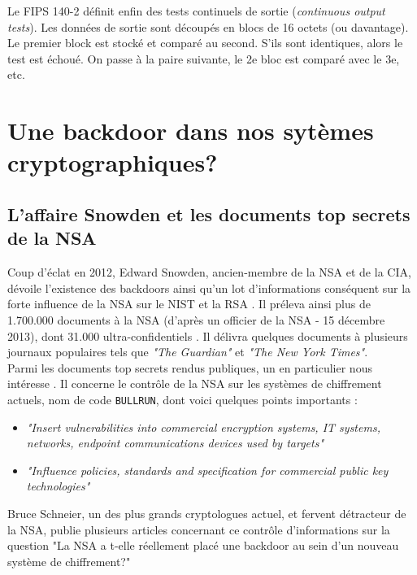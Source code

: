 		
		Le FIPS 140-2 définit enfin des tests continuels de sortie (\textit{continuous output tests}). Les données de sortie sont découpés en blocs de 16 octets (ou davantage). Le premier block est stocké et comparé au second. S'ils sont identiques, alors le test est échoué. On passe à la paire suivante, le 2e bloc est comparé avec le 3e, etc.

\section{Une backdoor dans nos sytèmes cryptographiques?}

	\subsection{L'affaire Snowden et les documents top secrets de la NSA}
	
	Coup d'éclat en 2012, Edward Snowden, ancien-membre de la NSA et de la CIA,	dévoile l'existence des backdoors ainsi qu'un lot d'informations conséquent sur la forte influence de la NSA sur le NIST et la RSA \cite{snowden2013reuters}.	Il préleva ainsi plus de 1.700.000 documents à la NSA (d'après un officier de la NSA - 15 décembre 2013), dont 31.000 ultra-confidentiels \cite{wikiSnowden}.	Il délivra quelques documents à plusieurs journaux populaires tels que \textit{"The Guardian"} et \textit{"The New York Times"}.\\
	
	
	Parmi les documents top secrets rendus publiques, un en particulier nous intéresse \cite{topsecretNSA}. Il concerne le contrôle de la NSA sur les systèmes de chiffrement actuels, nom de code \texttt{BULLRUN}, dont voici quelques points importants :\\ 
	\begin{itemize}
		\item \textit{"Insert vulnerabilities into commercial encryption systems, IT systems, networks, endpoint communications devices used by targets"}
		\item \textit{"Influence policies, standards and specification for commercial public key technologies"}\\
	\end{itemize}
	
	Bruce Schneier, un des plus grands cryptologues actuel, et fervent détracteur de la NSA, publie plusieurs articles concernant ce contrôle d'informations sur la question "La NSA a t-elle réellement placé une backdoor au sein d'un nouveau système de chiffrement?" \cite{schneier2007NSA} \\

